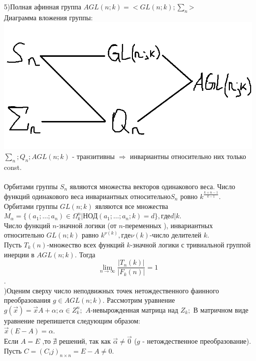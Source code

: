 5)Полная афинная группа $AGL(n;k)=<GL(n;k);\sum_n$>\\
Диаграмма вложения группы:\\
\includegraphics[scale=0.35]{dig}\\
$\sum_n; Q_n; AGL(n;k) $ - транзитивны $\Rightarrow$ инвариантны относительно них только const.\\\\
Орбитами группы $S_n$ являются множества векторов одинакового веса. Число функций одинакового веса инвариантных относительно$ S_n$ ровно $k^\frac {k+n-1}{k-1}$.\\


\thr
Орбитами группы $GL(n;k)$ являются все множества $M_\alpha=\{(a_1;\dots;a_n)\in \Omega_k^n|НОД(a_1;\dots;a_n;k)=d\}, где d|k$.\\
                   
\conseq
Число функций $n$-значной логики (от $n$-переменных ), инвариантных относительно $GL(n;k)$ равно $k^{\nu(k)},где \nu(k)$-число делителей $k$.\\


\thr
Пусть $T_k(n)$-множество всех функций $k$-значной логики с тривиальной группой инерции в $AGL(n;k)$. Тогда $$  \lim_{n\to\infty} \frac{|T_n(k)|}{|F_k(n)|}  =1$$.\\

)Оценим сверху число неподвижных точек нетождественного фаинного преобразования $g \in AGL(n;k)$.  Рассмотрим уравнение $g(\vec{x})=\vec{x}A+\alpha;\alpha \in Z_k^n;$ $A$-невырожденная матрица над $Z_k;$ В матричном виде уравнение перепишется следующим образом:\\
$\vec{x}(E-A)=\alpha. $\\
Если $A=E$ ,то $\nexists$ решений, так как $\vec{\alpha}\neq \vec{0}$ ($g$ - нетождественное преобразование). Пусть $ C=(C_ij)_{n \times n} = E-A \neq 0 $.\\

